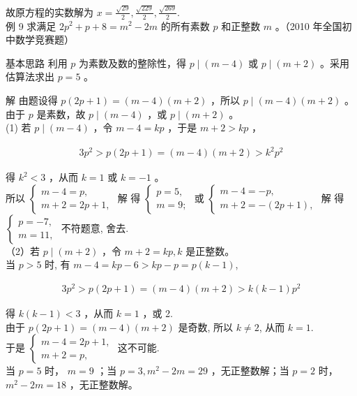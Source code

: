 \documentclass[10pt]{article}
\begin{document}
故原方程的实数解为 $x=\frac{\sqrt{29}}{2}, \frac{\sqrt{229}}{2}, \frac{\sqrt{269}}{2}$.\\
例 9 求满足 $2 p^{2}+p+8=m^{2}-2 m$ 的所有素数 $p$ 和正整数 $m$ 。（2010 年全国初中数学竞赛题）

基本思路 利用 $p$ 为素数及数的整除性，得 $p \mid(m-4)$ 或 $p \mid(m+2)$ 。采用估算法求出 $p=5$ 。

解 由题设得 $p(2 p+1)=(m-4)(m+2)$ ，所以 $p \mid(m-4)(m+2)$ 。由于 $p$ 是素数，故 $p \mid(m-4)$ ，或 $p \mid(m+2)$ 。\\
(1) 若 $p \mid(m-4)$ ，令 $m-4=k p$ ，于是 $m+2>k p$ ，

\begin{align*}
3 p^{2}>p(2 p+1)=(m-4)(m+2)>k^{2} p^{2}
\end{align*}

得 $k^{2}<3$ ，从而 $k=1$ 或 $k=-1$ 。\\
所以 $\left\{\begin{array}{l}m-4=p, \\ m+2=2 p+1,\end{array}\right.$ 解 得 $\left\{\begin{array}{l}p=5, \\ m=9 ;\end{array}\right.$ 或 $\left\{\begin{array}{l}m-4=-p, \\ m+2=-(2 p+1),\end{array}\right.$ 解 得 $\left\{\begin{array}{l}p=-7, \\ m=11,\end{array}\right.$ 不符题意, 舍去.\\
（2）若 $p \mid(m+2)$ ，令 $m+2=k p, k$ 是正整数。\\
当 $p>5$ 时, 有 $m-4=k p-6>k p-p=p(k-1)$,

\begin{align*}
3 p^{2}>p(2 p+1)=(m-4)(m+2)>k(k-1) p^{2}
\end{align*}

得 $k(k-1)<3$ ，从而 $k=1$ ，或 2.\\
由于 $p(2 p+1)=(m-4)(m+2)$ 是奇数, 所以 $k \neq 2$, 从而 $k=1$.\\
于是 $\left\{\begin{array}{l}m-4=2 p+1, \\ m+2=p,\end{array}\right.$ 这不可能.\\
当 $p=5$ 时， $m=9$ ；当 $p=3, m^{2}-2 m=29$ ，无正整数解；当 $p=2$ 时， $m^{2}-2 m=18$ ，无正整数解。
\end{document}
